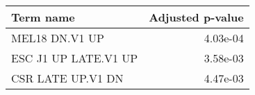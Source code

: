 \begin{tabular}{lr}
\toprule
           Term name &  Adjusted p-value \\
\midrule
      MEL18 DN.V1 UP &          4.03e-04 \\
ESC J1 UP LATE.V1 UP &          3.58e-03 \\
   CSR LATE UP.V1 DN &          4.47e-03 \\
\bottomrule
\end{tabular}
